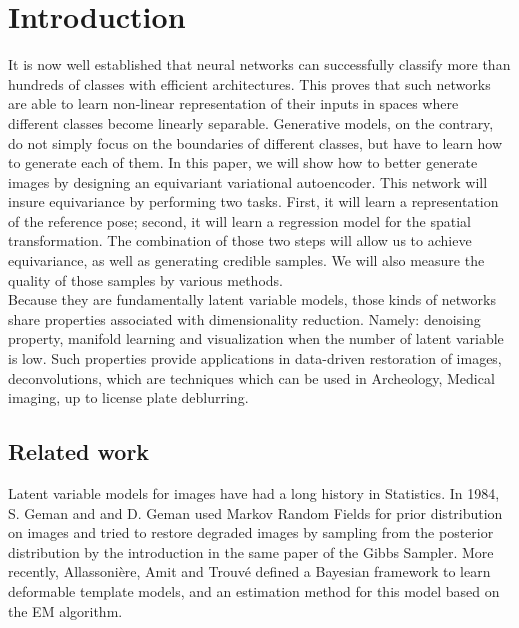 \documentclass[letterpaper, twoside]{article}
\begin{document}
\newpage




\section*{Introduction}
    
  It is now well established that neural networks can successfully classify more than hundreds of classes with efficient architectures. This proves that such networks are able to learn non-linear representation of their inputs in spaces where different classes become linearly separable. Generative models, on the contrary, do not simply focus on the boundaries of different classes, but have to learn how to generate each of them. In this paper, we will show how to better generate images by designing an equivariant variational autoencoder. This network will insure equivariance by performing two tasks. First, it will learn a representation of the reference pose; second, it will learn a regression model for the spatial transformation. The combination of those two steps will allow us to achieve equivariance, as well as generating credible samples. We will also measure the quality of those samples by various methods.\\

  Because they are fundamentally latent variable models, those kinds of networks share properties associated with dimensionality reduction. Namely: denoising property, manifold learning and visualization when the number of latent variable is low. Such properties provide applications in data-driven restoration of images, deconvolutions, which are techniques which can be used in Archeology, Medical imaging, up to license plate deblurring.

  \subsection*{Related work}
    Latent variable models for images have had a long history in Statistics. In 1984, S. Geman and and D. Geman \cite{Geman:1984:SRG:2286442.2286617} used Markov Random Fields for prior distribution on images and tried to restore degraded images by sampling from the posterior distribution by the introduction in the same paper of the Gibbs Sampler. More recently, Allassonière, Amit and Trouvé \cite{Allasson.statfram} defined a Bayesian framework to learn deformable template models, and an estimation method for this model based on the EM algorithm.\\
\end{document}
